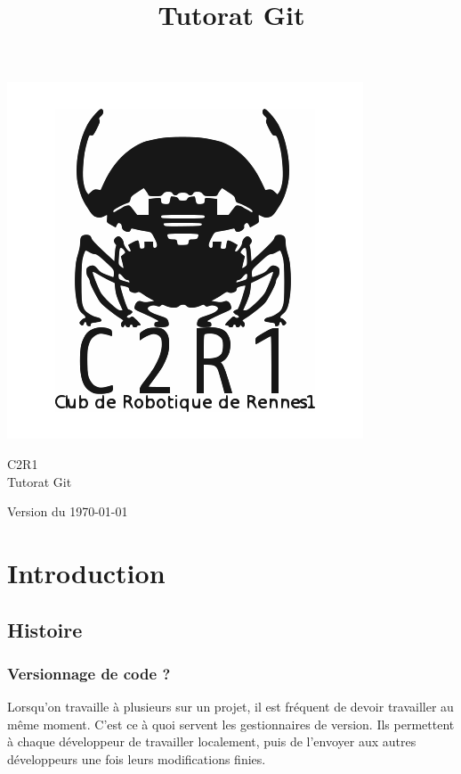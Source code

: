 \documentclass[a4paper,10pt]{report}
\title{Tutorat Git}
\begin{document}
\renewcommand{\chaptername}{Partie}

\begin{titlepage}
\vspace{-3cm}\hspace{-2cm}\includegraphics[scale=0.4]{C2R1}
\begin{center}
\vspace{2cm}
{\selectfont
\Large{C2R1}\\
\vspace{0.5cm}
\Huge{Tutorat Git}}\\
\end{center}
\begin{flushright}
 \vfill
{\selectfont
\large{Version du \today}}
\end{flushright}
\end{titlepage}

\pagestyle{plain}

\tableofcontents
\newpage

\chapter{Introduction}
  \section{Histoire}
    \subsection{Versionnage de code ?}
Lorsqu'on travaille \`a plusieurs sur un projet, il est fr\'equent de devoir travailler au m\^eme moment. C'est ce \`a quoi servent les gestionnaires de version. Ils permettent \`a chaque d\'eveloppeur de travailler localement, puis de l'envoyer aux autres d\'eveloppeurs une fois leurs modifications finies.
\end{document}
